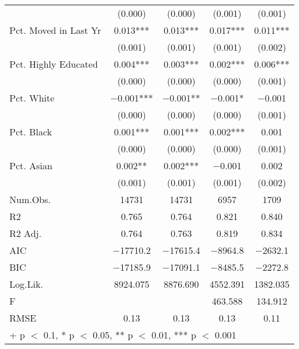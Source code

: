 \documentclass[12pt,english]{article}
\begin{document}
\begin{table*}[p]
\begin{adjustwidth}{-1in}{-1in}
\begin{tabular}{lcccc}
 & (\num{0.000}) & (\num{0.000}) & (\num{0.001}) & (\num{0.001})\\
Pct. Moved in Last Yr & \num{0.013}*** & \num{0.013}*** & \num{0.017}*** & \num{0.011}***\\
 & (\num{0.001}) & (\num{0.001}) & (\num{0.001}) & \vphantom{1} (\num{0.002})\\
Pct. Highly Educated & \num{0.004}*** & \num{0.003}*** & \num{0.002}*** & \num{0.006}***\\
 & (\num{0.000}) & (\num{0.000}) & (\num{0.000}) & \vphantom{3} (\num{0.001})\\
Pct. White & \num{-0.001}*** & \num{-0.001}** & \num{-0.001}* & \num{-0.001}\\
 & (\num{0.000}) & (\num{0.000}) & (\num{0.000}) & \vphantom{2} (\num{0.001})\\
Pct. Black & \num{0.001}*** & \num{0.001}*** & \num{0.002}*** & \num{0.001}\\
 & (\num{0.000}) & (\num{0.000}) & (\num{0.000}) & \vphantom{1} (\num{0.001})\\
Pct. Asian & \num{0.002}** & \num{0.002}*** & \num{-0.001} & \num{0.002}\\
 & (\num{0.001}) & (\num{0.001}) & (\num{0.001}) & (\num{0.002})\\
\midrule
Num.Obs. & \num{14731} & \num{14731} & \num{6957} & \num{1709}\\
R2 & \num{0.765} & \num{0.764} & \num{0.821} & \num{0.840}\\
R2 Adj. & \num{0.764} & \num{0.763} & \num{0.819} & \num{0.834}\\
AIC & \num{-17710.2} & \num{-17615.4} & \num{-8964.8} & \num{-2632.1}\\
BIC & \num{-17185.9} & \num{-17091.1} & \num{-8485.5} & \num{-2272.8}\\
Log.Lik. & \num{8924.075} & \num{8876.690} & \num{4552.391} & \num{1382.035}\\
F &  &  & \num{463.588} & \num{134.912}\\
RMSE & \num{0.13} & \num{0.13} & \num{0.13} & \num{0.11}\\
\bottomrule
\multicolumn{5}{l}{\rule{0pt}{1em}+ p $<$ 0.1, * p $<$ 0.05, ** p $<$ 0.01, *** p $<$ 0.001}\\
\end{tabular}
\end{adjustwidth}
\end{table*}
\clearpage
\end{document}
